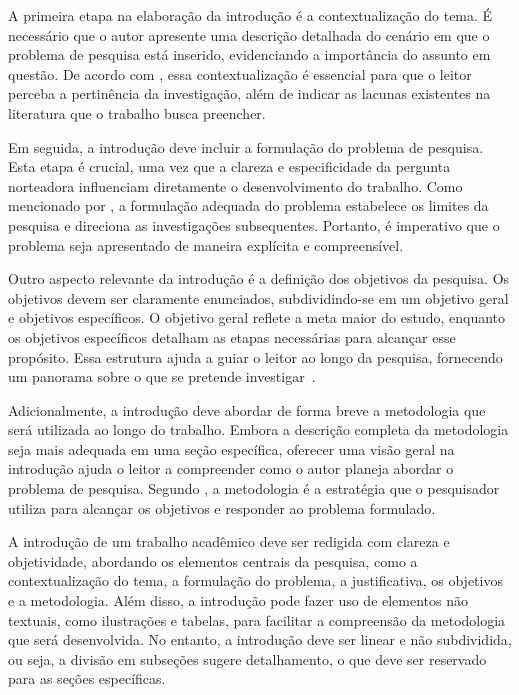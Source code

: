 \documentclass[
    12pt
    ,oneside
    ,a4paper
    ,chapter=TITLE
    ,section=TITLE
    ,sumario=abnt-6027-2012]{abntex2}
\begin{document}
A primeira etapa na elaboração da introdução é a contextualização do tema. É necessário que o autor apresente uma descrição detalhada do cenário em que o problema de pesquisa está inserido, evidenciando a importância do assunto em questão. De acordo com , essa contextualização é essencial para que o leitor perceba a pertinência da investigação, além de indicar as lacunas existentes na literatura que o trabalho busca preencher.

Em seguida, a introdução deve incluir a formulação do problema de pesquisa. Esta etapa é crucial, uma vez que a clareza e especificidade da pergunta norteadora influenciam diretamente o desenvolvimento do trabalho. Como mencionado por , a formulação adequada do problema estabelece os limites da pesquisa e direciona as investigações subsequentes. Portanto, é imperativo que o problema seja apresentado de maneira explícita e compreensível.

Outro aspecto relevante da introdução é a definição dos objetivos da pesquisa. Os objetivos devem ser claramente enunciados, subdividindo-se em um objetivo geral e objetivos específicos. O objetivo geral reflete a meta maior do estudo, enquanto os objetivos específicos detalham as etapas necessárias para alcançar esse propósito. Essa estrutura ajuda a guiar o leitor ao longo da pesquisa, fornecendo um panorama sobre o que se pretende investigar~\cite{gil}.

Adicionalmente, a introdução deve abordar de forma breve a metodologia que será utilizada ao longo do trabalho. Embora a descrição completa da metodologia seja mais adequada em uma seção específica, oferecer uma visão geral na introdução ajuda o leitor a compreender como o autor planeja abordar o problema de pesquisa. Segundo , a metodologia é a estratégia que o pesquisador utiliza para alcançar os objetivos e responder ao problema formulado.

A introdução de um trabalho acadêmico deve ser redigida com clareza e objetividade, abordando os elementos centrais da pesquisa, como a contextualização do tema, a formulação do problema, a justificativa, os objetivos e a metodologia. Além disso, a introdução pode fazer uso de elementos não textuais, como ilustrações e tabelas, para facilitar a compreensão da metodologia que será desenvolvida. No entanto, a introdução deve ser linear e não subdividida, ou seja, a divisão em subseções sugere detalhamento, o que deve ser reservado para as seções específicas.
\end{document}
